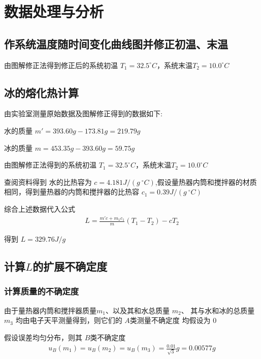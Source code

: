 \documentclass[UTF8]{ctexart}
\begin{document}
\section{数据处理与分析}
\subsection{作系统温度随时间变化曲线图并修正初温、末温}
\vspace{12cm} %


\vfill
由图解修正法得到修正后的系统初温 $T_1 = 32.5^{\circ} C$，系统末温$T_2 = 10.0^{\circ} C$

\subsection{冰的熔化热计算}
由实验室测量原始数据及图解修正得到的数据如下:

水的质量 $m'= 393.60g - 173.81g =  219.79g$ 

冰的质量 $m= 453.35g - 393.60g =  59.75g$ 

由图解修正法得到的系统初温  $T_1 = 32.5^{\circ} C$，系统末温$T_2 = 10.0^{\circ} C$

查阅资料得到 水的比热容为 $c = 4.181J/(g\    ^{\circ}C)$,假设量热器内筒和搅拌器的材质相同，得到量热器的内筒和搅拌器的比热容 $c_1 = 0.39J/(g\    ^{\circ}C)$

综合上述数据代入公式
\begin{align*}
    L =  \frac{m'c+m_1c_1}{m}(T_1 - T_2) - cT_2 
\end{align*}

得到 $L =  329.76 J/g$

\subsection{计算$L$的扩展不确定度}
\subsubsection{计算质量的不确定度}
由于量热器内筒和搅拌器质量$m_1$、以及其和水总质量 $m_2$、 其与水和冰的总质量 $m_3$ 均由电子天平测量得到，则它们的 $A$类测量不确定度 均假设为 0 

假设误差均匀分布，则其 $B$类不确定度
\begin{align*}
    u_{B}(m_1) = u_{B}(m_2) = u_{B}(m_3) = \frac{0.01}{\sqrt{3}}g = 0.00577g
\end{align*}
\end{document}
